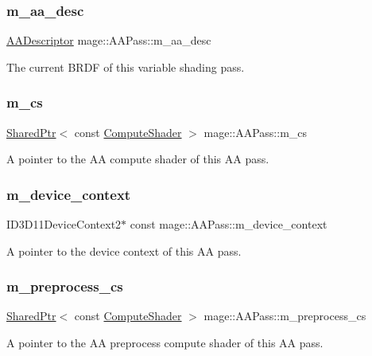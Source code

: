 \subsubsection{\texorpdfstring{m\+\_\+aa\+\_\+desc}{m\_aa\_desc}}
{\footnotesize\ttfamily \hyperlink{namespacemage_a86cd40b8f2f42ca4d616cc6ec665a7f2}{A\+A\+Descriptor} mage\+::\+A\+A\+Pass\+::m\+\_\+aa\+\_\+desc\hspace{0.3cm}{\ttfamily [private]}}

The current B\+R\+DF of this variable shading pass. \hypertarget{classmage_1_1_a_a_pass_aca04ca410ab5c0d1cd4270f2c7ccfe1c}{}\label{classmage_1_1_a_a_pass_aca04ca410ab5c0d1cd4270f2c7ccfe1c} 
\subsubsection{\texorpdfstring{m\+\_\+cs}{m\_cs}}
{\footnotesize\ttfamily \hyperlink{namespacemage_a1e01ae66713838a7a67d30e44c67703e}{Shared\+Ptr}$<$ const \hyperlink{namespacemage_ae040329401484b076f0cd1a7c43d19c9}{Compute\+Shader} $>$ mage\+::\+A\+A\+Pass\+::m\+\_\+cs\hspace{0.3cm}{\ttfamily [private]}}

A pointer to the AA compute shader of this AA pass. \hypertarget{classmage_1_1_a_a_pass_a5bd4d23f46116244fc48e3b785983c0b}{}\label{classmage_1_1_a_a_pass_a5bd4d23f46116244fc48e3b785983c0b} 
\subsubsection{\texorpdfstring{m\+\_\+device\+\_\+context}{m\_device\_context}}
{\footnotesize\ttfamily I\+D3\+D11\+Device\+Context2$\ast$ const mage\+::\+A\+A\+Pass\+::m\+\_\+device\+\_\+context\hspace{0.3cm}{\ttfamily [private]}}

A pointer to the device context of this AA pass. \hypertarget{classmage_1_1_a_a_pass_a9b8a50f0e4b21ae3f558cb010acfa3b1}{}\label{classmage_1_1_a_a_pass_a9b8a50f0e4b21ae3f558cb010acfa3b1} 
\subsubsection{\texorpdfstring{m\+\_\+preprocess\+\_\+cs}{m\_preprocess\_cs}}
{\footnotesize\ttfamily \hyperlink{namespacemage_a1e01ae66713838a7a67d30e44c67703e}{Shared\+Ptr}$<$ const \hyperlink{namespacemage_ae040329401484b076f0cd1a7c43d19c9}{Compute\+Shader} $>$ mage\+::\+A\+A\+Pass\+::m\+\_\+preprocess\+\_\+cs\hspace{0.3cm}{\ttfamily [private]}}

A pointer to the AA preprocess compute shader of this AA pass. 
